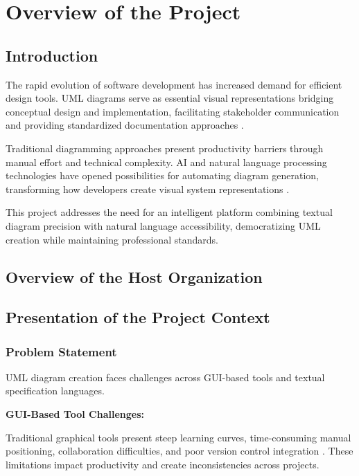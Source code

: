 \chapter[Overview]{Overview of the Project}


\section{Introduction}

The rapid evolution of software development has increased demand for efficient design tools. UML diagrams serve as essential visual representations bridging conceptual design and implementation, facilitating stakeholder communication and providing standardized documentation approaches \cite{uml_importance}.

Traditional diagramming approaches present productivity barriers through manual effort and technical complexity. AI and natural language processing technologies have opened possibilities for automating diagram generation, transforming how developers create visual system representations \cite{ai_diagramming}.

This project addresses the need for an intelligent platform combining textual diagram precision with natural language accessibility, democratizing UML creation while maintaining professional standards.

\section{Overview of the Host Organization}

\section{Presentation of the Project Context}

\subsection{Problem Statement}

UML diagram creation faces challenges across GUI-based tools and textual specification languages.

\textbf{GUI-Based Tool Challenges:}

Traditional graphical tools present steep learning curves, time-consuming manual positioning, collaboration difficulties, and poor version control integration \cite{gui_limitations}. These limitations impact productivity and create inconsistencies across projects.

